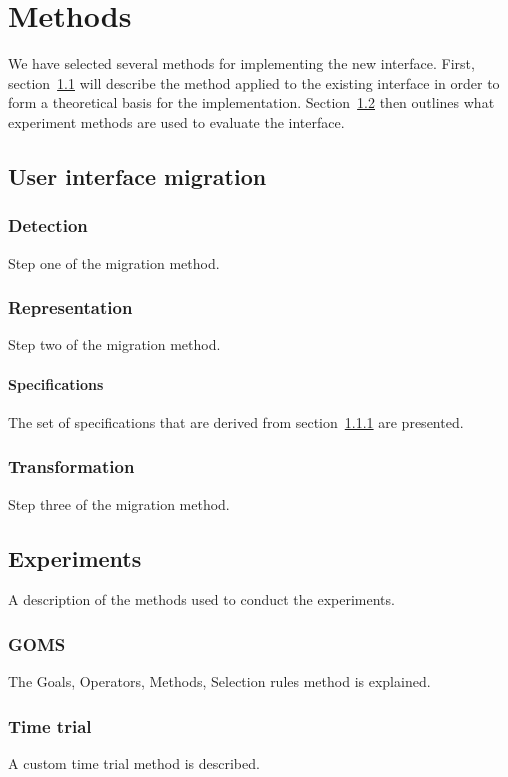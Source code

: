 \chapter{Methods}
\label{chapter:methods}
We have selected several methods for implementing the new interface. First, section~\ref{section:userinterfacemigration} will describe the method applied to the existing interface in order to form a theoretical basis for the implementation. Section~\ref{section:experiments_methods} then outlines what experiment methods are used to evaluate the interface.

\section{User interface migration}
\label{section:userinterfacemigration}


\subsection{Detection}
\label{subsection:detection}
Step one of the migration method.

\subsection{Representation}
\label{subsection:representation}
Step two of the migration method.

\subsubsection{Specifications}
\label{subsubsection:specifications}
The set of specifications that are derived from section~\ref{subsection:detection} are presented.

\subsection{Transformation}
\label{subsection:transformation}
Step three of the migration method.

\section{Experiments}
\label{section:experiments_methods}
A description of the methods used to conduct the experiments.

\subsection{GOMS}
\label{subsection:goms_methods}
The Goals, Operators, Methods, Selection rules method is explained.

\subsection{Time trial}
\label{subsection:timetrial_methods}
A custom time trial method is described.